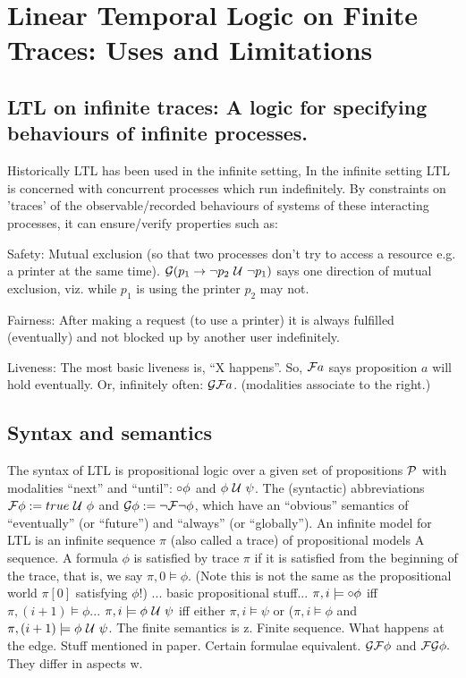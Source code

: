 
\section{Linear Temporal Logic on Finite Traces: Uses and Limitations}

\subsection{LTL on infinite traces: A logic for specifying behaviours of infinite processes.}
Historically LTL has been used in the infinite setting,
In the infinite setting LTL is concerned with concurrent processes which run indefinitely. By constraints on 'traces' of the observable/recorded behaviours of systems of these interacting processes, it can ensure/verify properties such as:

Safety:
Mutual exclusion (so that two processes don't try to access a resource e.g. a printer at the same time).
$\mathcal{G}(p_1 \to \neg p_2 \ \mathcal{U}\  \neg p_1)$ says one direction of mutual exclusion, viz. while $p_1$ is using the printer
$p_2$ may not.

Fairness:
After making a request (to use a printer) it is always fulfilled (eventually) and not blocked up by another user indefinitely.

Liveness:
The most basic liveness is, ``X happens''. So, $\mathcal{F} a$ says proposition $a$ will hold eventually.
Or, infinitely often: $\mathcal{G} \mathcal{F} a$. (modalities associate to the right.)
\subsection{Syntax and semantics}
The syntax of LTL is propositional logic over a given set of propositions $\mathcal{P}$ with modalities ``next'' and ``until'': $\circ \phi$ and $\phi \ \mathcal{U}\  \psi$.
The (syntactic) abbreviations  $\mathcal{F} \phi := true \ \mathcal{U}\  \phi$ and $\mathcal{G} \phi := \neg \mathcal{F} \neg \phi$, which have an ``obvious'' semantics of ``eventually'' (or ``future'') and ``always'' (or ``globally'').
An infinite model for LTL is an infinite sequence $\pi$ (also called a trace) of propositional models
A sequence. A formula $\phi$ is satisfied by trace $\pi$ if it is satisfied from the beginning of the trace, that is, we say $\pi, 0 \models \phi$. (Note this is not the same as the propositional world $\pi[0]$ satisfying $\phi$!)
... basic propositional stuff... $\pi, i \models \circ\phi$ iff $\pi, (i+1) \models\phi$... $\pi, i \models \phi\ \mathcal{U}\ \psi$ iff either $\pi, i \models \psi$ or ($\pi, i \models \phi$ and $\pi, (i+1) \models \phi\ \mathcal{U}\ \psi$.
The finite semantics is z. Finite sequence. What happens at the edge. Stuff mentioned in paper. Certain formulae equivalent. $\mathcal{G} \mathcal{F} \phi$ and $\mathcal{F} \mathcal{G} \phi.$
They differ in aspects w.

